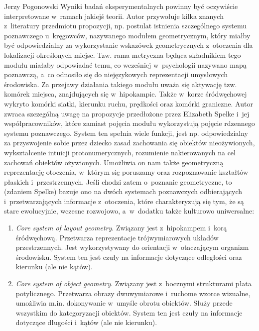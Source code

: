 \begin{newrevplenv}{Jerzy Pogonowski}
Wyniki badań eksperymentalnych powinny być oczywiście
interpretowane w~ramach jakiejś teorii. Autor przywołuje kilka
znanych z~literatury przedmiotu propozycji, np. postulat istnienia
szczególnego systemu poznawczego u~kręgowców, nazywanego modułem
geometrycznym, który miałby być odpowiedzialny za wykorzystanie
wskazówek geometrycznych z~otoczenia dla lokalizacji określonych
miejsc. Tzw. rama metryczna będąca składnikiem tego modułu miałaby
odpowiadać temu, co wcześniej w~psychologii nazywano mapą
poznawczą, a~co odnosiło się do niejęzykowych reprezentacji
umysłowych środowiska. Za przejawy działania takiego modułu uważa
się aktywację tzw. komórek miejsca, znajdujących się w~hipokampie.
Także w~korze śródwęchowej wykryto komórki siatki, kierunku ruchu,
prędkości oraz komórki graniczne. Autor zwraca szczególną uwagę na
propozycje przedłożone przez Elizabeth Spelke i~jej
współpracowników, które zamiast pojęcia modułu wykorzystują
pojęcie rdzennego systemu poznawczego. System ten spełnia wiele
funkcji, jest np. odpowiedzialny za przyswojenie sobie przez
dziecko zasad zachowania się obiektów nieożywionych, wykształcenie
intuicji protonumerycznych, rozumienie nakierowanych na cel
zachowań obiektów ożywionych. Umożliwia on nam także geometryczną
reprezentację otoczenia, w~którym się poruszamy oraz rozpoznawanie
kształtów płaskich i~przestrzennych. Jeśli chodzi zatem o~poznanie
geometryczne, to (zdaniem Spelke) bazuje ono na dwóch systemach
poznawczych odbierających i~przetwarzających informacje z~otoczenia, które charakteryzują się tym, że są stare ewolucyjnie,
wczesne rozwojowo, a~w~dodatku także kulturowo uniwersalne:

\begin{enumerate}

\item {\em Core system of layout geometry}. Związany jest z~hipokampem i~korą śródwęchową. Przetwarza reprezentacje
trójwymiarowych układów przestrzennych. Jest wykorzystywany do
orientacji w~otaczającym organizm środowisku. System ten jest
czuły na informacje dotyczące odległości oraz kierunku (ale nie
kątów).

\item {\em Core system of object geometry}. Związany jest z~bocznymi strukturami płata potylicznego. Przetwarza obrazy
dwuwymiarowe i~ruchome wzorce wizualne, umożliwia m.in.
dokonywanie w~umyśle obrotu obiektów. Służy przede wszystkim do
kategoryzacji obiektów. System ten jest czuły na informacje
dotyczące długości i~kątów (ale nie kierunku).


\end{enumerate}
\end{newrevplenv}
